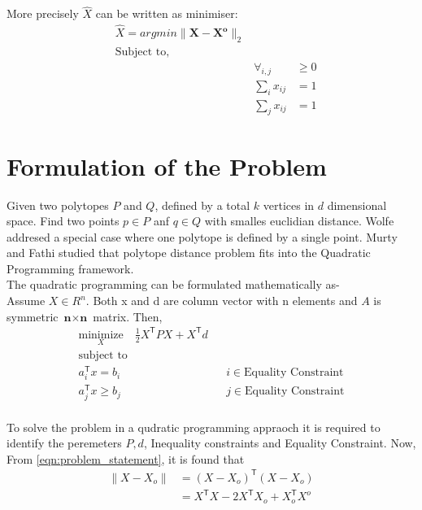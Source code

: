 More precisely $\hat{X}$ can be written as minimiser:
\begin{equation}
\begin{aligned}
& \hat{X} = argmin \parallel \mathbf{X-X^o} \parallel _2\\
& \text{Subject to,}\\
& & \forall _{i,j} &\geq 0 \\
& & \sum_{i} x_{ij}&=1 \\
& & \sum_{j} x_{ij}&=1
\end{aligned}
\label{eqn:problem_statement}
\end{equation}

\section{Formulation of the Problem}
Given two polytopes $P$ and $Q$, defined by a total $k$ vertices in $d$ dimensional space. Find two points $p \in P$ anf $q \in Q$ with smalles euclidian distance. Wolfe addresed a special case where one polytope is defined by a single point. Murty and Fathi studied that polytope distance problem fits into the Quadratic Programming framework.\\
The quadratic programming can be formulated mathematically as-\\

Assume $X \in R^n$. Both x and d are column vector with n elements and $A$ is symmetric $\textbf{n} \times \textbf{n} $ matrix. Then,\\

\begin{equation}
\begin{aligned}
\underset{X}{\text{minimize}} \quad \frac{1}{2}X^\mathsf{T} PX+X^\mathsf{T}d\\
\text{subject to} \quad \\
a_i^\mathsf{T}x =b_i & & i\in \textrm{Equality Constraint}\\
a_j^\mathsf{T}x \geq b_j & & j\in \textrm{Equality Constraint}\\
\end{aligned}
\label{eqn:problem_formulation_1}
\end{equation}
 


To solve the problem in a qudratic programming appraoch it is required to identify the peremeters $P,d$, Inequality constraints and Equality Constraint. Now, From \ref{eqn:problem_statement}, it is found that
\begin{equation}
\begin{aligned}
\lVert {X-X_o} \rVert & = (X-X_o)^\mathsf{T}(X-X_o)\\
& = X^\mathsf{T}X-2X^{\mathsf{T}}X_o+X_o^{\mathsf{T}}X^o
\end{aligned}
\label{eqn:problem_formulation_2}
\end{equation}

